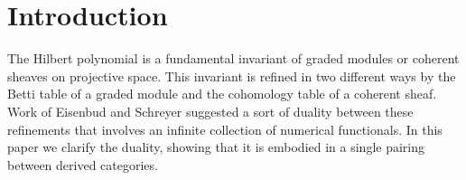 \documentclass[12pt]{amsart}
\theoremstyle{definition}
\theoremstyle{remark}
\def\BS{Boij--S\"oderberg~}
\begin{document}
\section*{Introduction}
%
%
%

The Hilbert polynomial is a fundamental invariant of graded modules or coherent sheaves on projective space. This invariant is refined in two different ways by the Betti table of a graded module and the cohomology table of a coherent sheaf. Work of Eisenbud and Schreyer \cite{eis-schrey1} suggested a sort of  duality between these refinements that involves an infinite collection of numerical functionals. In this paper we clarify the duality, showing that it is embodied in
a single pairing between derived categories.
\end{document}
